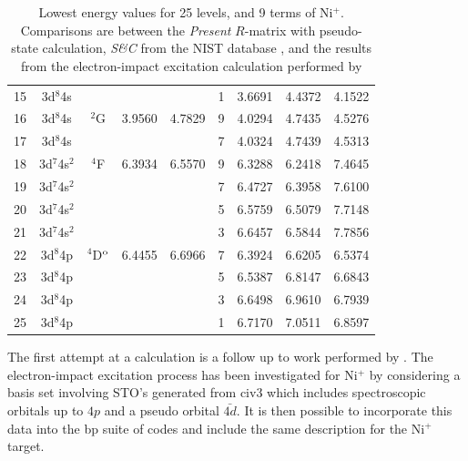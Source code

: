 \begin{table}[hbt]
\begin{center}
\begin{tabular}{@{}        c c c c         c c c c c        @{}}
\multicolumn{1}{c}{15} &  3d$^8$4s  &                  &    &   &  1 &   3.6691   &  4.4372 &  4.1522\\
\multicolumn{1}{c}{16} &  3d$^8$4s  & $^2$G  & 3.9560   & 4.7829  &  9 &  4.0294 &  4.7435 &  4.5276\\
\multicolumn{1}{c}{17} &  3d$^8$4s  &                  &   &  &  7 &  4.0324  &  4.7439 &  4.5313 \\
\multicolumn{1}{c}{18} &  3d$^7$4s$^2$  &  $^4$F  &  6.3934    & 6.5570 &  9 &  6.3288  &  6.2418 &  7.4645\\
\multicolumn{1}{c}{19} &  3d$^7$4s$^2$  &                  &    &   &  7 &  6.4727 &  6.3958 & 7.6100\\
\multicolumn{1}{c}{20} &  3d$^7$4s$^2$  &                  &  &   &  5 &  6.5759  &  6.5079 &  7.7148\\
\multicolumn{1}{c}{21} &  3d$^7$4s$^2$  &                  &    &   &  3 &    6.6457  &  6.5844 &  7.7856\\
\multicolumn{1}{c}{22} &  3d$^8$4p  &  $^4$D$^{\rm o}$ &   6.4455   & 6.6966  &  7 & 6.3924   &  6.6205 & 6.5374\\
\multicolumn{1}{c}{23} &  3d$^8$4p  &                  &    &  &  5 &   6.5387   &  6.8147 &  6.6843\\
\multicolumn{1}{c}{24} &  3d$^8$4p  &                  &    &   &  3 &   6.6498  &  6.9610 &  6.7939\\
\multicolumn{1}{c}{25} &  3d$^8$4p  &                  &    &   &  1 &    6.7170 & 7.0511 &  6.8597\\
         
\bottomrule
 \end{tabular}
  \caption{Lowest energy values for 25 levels, and 9 terms of Ni$^{+}$. Comparisons are between the \textit{Present} $R$-matrix with pseudo-state calculation, \textit{S\&C} from the NIST database \citep{1985aeli.book.....S}, and the results from the electron-impact excitation calculation performed by \citet{2010A&A...513A..55C}  \label{tab:ni_energy}}
 \end{center}
\end{table}

The first attempt at a calculation is a follow up to work performed by \citet{clarathesis}. The electron-impact excitation process has been investigated for Ni$^+$ \citep{2010A&A...513A..55C, 2011ApJ...738....5C} by considering a basis set involving STO's generated from {\sc civ3} which includes spectroscopic orbitals up to $4p$ and a pseudo orbital $\bar{4d}$. It is then possible to incorporate this data into the {\sc bp} suite of codes and include the same description for the Ni$^+$ target.

